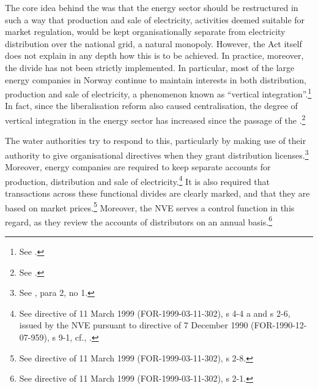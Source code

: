 
The core idea behind the \cite{ea90} was that the energy sector should be restructured in such a way that production and sale of electricity, activities deemed suitable for market regulation, would be kept organisationally separate from electricity distribution over the national grid, a natural monopoly. However, the Act itself does not explain in any depth how this is to be achieved. In practice, moreover, the divide has not been strictly implemented. In particular, most of the large energy companies in Norway continue to maintain interests in both distribution, production and sale of electricity, a phenomenon known as ``vertical integration''.\footnote{See \cite[580-583]{bibow03}.} In fact, since the liberalisation reform also caused centralisation, the degree of vertical integration in the energy sector has increased since the passage of the \cite{ea90}.\footnote{See \cite[583]{bibow03}.}

The water authorities try to respond to this, particularly by making use of their authority to give organisational directives when they grant distribution licenses.\footnote{See \cite[4-1]{ea90}, para 2, no 1.} Moreover, energy companies are required to keep separate accounts for production, distribution and sale of electricity.\footnote{See directive of 11 March 1999 (FOR-1999-03-11-302), s 4-4 a and s 2-6, issued by the NVE pursuant to directive of 7 December 1990 (FOR-1990-12-07-959), s 9-1, cf., \cite[10-6]{ea90}.} It is also required that transactions across these functional divides are clearly marked, and that they are based on market prices.\footnote{See directive of 11 March 1999 (FOR-1999-03-11-302), s 2-8.} Moreover, the NVE serves a control function in this regard, as they review the accounts of distributors on an annual basis.\footnote{See directive of 11 March 1999 (FOR-1999-03-11-302), s 2-1.}


